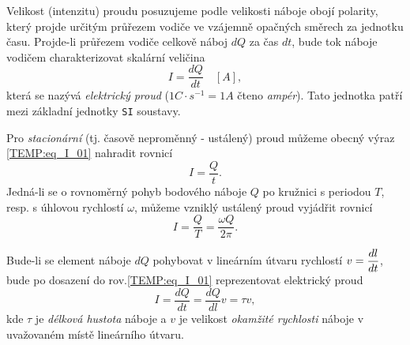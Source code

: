       Velikost (intenzitu) proudu posuzujeme podle velikosti náboje obojí polarity, který projde
      určitým průřezem vodiče ve vzájemně opačných směrech za jednotku času. Projde-li průřezem
      vodiče celkově náboj $dQ$ za čas $dt$, bude tok náboje vodičem charakterizovat skalární
      veličina
        \begin{equation}\label{TEMP:eq_I_01}
          I = \frac{dQ}{dt} \quad[A],  
        \end{equation}        
      která se nazývá \emph{elektrický proud} ($1C\cdot s^{-1} = 1A $ čteno \emph{ampér}). Tato
      jednotka patří mezi základní jednotky \texttt{SI} soustavy.
      
      Pro \emph{stacionární} (tj. časově neproměnný - ustálený) proud můžeme obecný výraz
      \ref{TEMP:eq_I_01} nahradit rovnicí
        \begin{equation}\label{TEMP:eq_I_02}
          I = \frac{Q}{t}.  
        \end{equation}       
      Jedná-li se o rovnoměrný pohyb bodového náboje $Q$ po kružnici s periodou $T$, resp. s
      úhlovou rychlostí $\omega$, můžeme vzniklý ustálený proud vyjádřit rovnicí 
        \begin{equation}\label{TEMP:eq_I_03}
          I = \frac{Q}{T} = \frac{\omega Q}{2\pi}.  
        \end{equation}
      
      Bude-li se element náboje $dQ$ pohybovat v lineárním útvaru rychlostí $v = \dfrac{d l}{d t}$, bude 
      po dosazení do rov.\ref{TEMP:eq_I_01} reprezentovat elektrický proud 
        \begin{equation}\label{TEMP:eq_I_04}
          I = \frac{dQ}{dt} = \frac{dQ}{dl}v = \tau v, 
        \end{equation}      
      kde $\tau$ je \emph{délková hustota} náboje a $v$ je velikost \emph{okamžité rychlosti}
      náboje v uvažovaném místě lineárního útvaru. 

      
